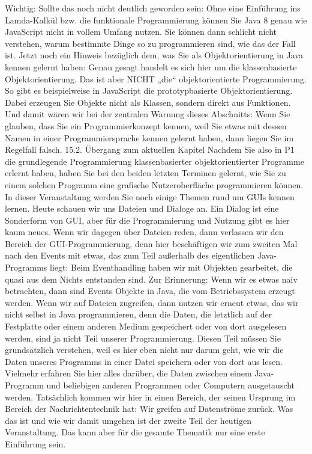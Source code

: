 Wichtig: Sollte das noch nicht deutlich geworden sein: Ohne eine Einführung ins Lamda-Kalkül bzw. die funktionale Programmierung können Sie Java 8 genau wie JavaScript nicht in vollem Umfang nutzen. Sie können dann schlicht nicht verstehen, warum bestimmte Dinge so zu programmieren sind, wie das der Fall ist.
Jetzt noch ein Hinweis bezüglich dem, was Sie als Objektorientierung in Java kennen gelernt haben: Genau gesagt handelt es sich hier um die klassenbasierte Objektorientierung. Das ist aber NICHT „die“ objektorientierte Programmierung. So gibt es beispielweise in JavaScript die prototypbasierte Objektorientierung. Dabei erzeugen Sie Objekte nicht als Klassen, sondern direkt aus Funktionen.
Und damit wären wir bei der zentralen Warnung dieses Abschnitts: Wenn Sie glauben, dass Sie ein Programmierkonzept kennen, weil Sie etwas mit dessen Namen in einer Programmiersprache kennen gelernt haben, dann liegen Sie im Regelfall falsch.
15.2.	Übergang zum aktuellen Kapitel
Nachdem Sie also in P1 die grundlegende Programmierung klassenbasierter objektorientierter Programme erlernt haben, haben Sie bei den beiden letzten Terminen gelernt, wie Sie zu einem solchen Programm eine grafische Nutzeroberfläche programmieren können.
In dieser Veranstaltung werden Sie noch einige Themen rund um GUIs kennen lernen. Heute schauen wir uns Dateien und Dialoge an.
Ein Dialog ist eine Sonderform von GUI, aber für die Programmierung und Nutzung gibt es hier kaum neues.
Wenn wir dagegen über Dateien reden, dann verlassen wir den Bereich der GUI-Programmierung, denn hier beschäftigen wir zum zweiten Mal nach den Events mit etwas, das zum Teil außerhalb des eigentlichen Java-Programms liegt: Beim Eventhandling haben wir mit Objekten gearbeitet, die quasi aus dem Nichts entstanden sind. Zur Erinnerung: Wenn wir es etwas naiv betrachten, dann sind Events Objekte in Java, die vom Betriebssystem erzeugt werden.
Wenn wir auf Dateien zugreifen, dann nutzen wir erneut etwas, das wir nicht selbst in Java programmieren, denn die Daten, die letztlich auf der Festplatte oder einem anderen Medium gespeichert oder von dort ausgelesen werden, sind ja nicht Teil unserer Programmierung. Diesen Teil müssen Sie grundsätzlich verstehen, weil es hier eben nicht nur darum geht, wie wir die Daten unseres Programms in einer Datei speichern oder von dort aus lesen. Vielmehr erfahren Sie hier alles darüber, die Daten zwischen einem Java-Programm und beliebigen anderen Programmen oder Computern ausgetauscht werden.
Tatsächlich kommen wir hier in einen Bereich, der seinen Ursprung im Bereich der Nachrichtentechnik hat: Wir greifen auf Datenströme zurück. Was das ist und wie wir damit umgehen ist der zweite Teil der heutigen Veranstaltung. Das kann aber für die gesamte Thematik nur eine erste Einführung sein.
